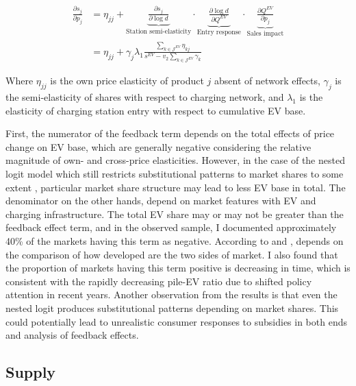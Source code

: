 \documentclass[12pt]{article}
\begin{document}
\begin{equation}
\begin{aligned}
\frac{\partial s_j}{\partial p_j} &= \eta_{jj} + 
\underbrace{\frac{\partial s_j}{\partial \log d}}_{\text{Station semi-elasticity}} 
\cdot \underbrace{\frac{\partial \log d}{\partial Q^{EV}}}_{\text{Entry response}} 
\cdot \underbrace{\frac{\partial Q^{EV}}{\partial p_j}}_{\text{Sales impact}} \\
&= \eta_{jj} + \gamma_j \lambda_1 \frac{\sum_{k \in \mathcal{J}^{EV}} \eta_{kj}}{s^{EV} - v_2 \sum_{k \in \mathcal{J}^{EV}} \gamma_k}
\end{aligned}
\end{equation}

Where $\eta_{jj}$ is the own price elasticity of product $j$ absent of network effects,
$\gamma_j$ is the semi-elasticity of shares with respect to charging network,
and $\lambda_1$ is the elasticity of charging station entry with respect to cumulative EV base.

First, the numerator of the feedback term depends on the total effects of price change on EV base, which are generally negative considering the relative magnitude of own- and cross-price elasticities.
However, in the case of the nested logit model which still restricts substitutional patterns to market shares to some extent \citep{nevo_practitioners_2000, grigolon_nested_2014}, particular market share structure may lead to less EV base in total.
The denominator on the other hands, depend on market features with EV and charging infrastructure.
The total EV share may or may not be greater than the feedback effect term, and in the observed sample, I documented approximately 40\% of the markets having this term as negative.
According to \citet{springel_network_2021} and \citet{remmy_adjustable_2024}, depends on the comparison of how developed are the two sides of market.
I also found that the proportion of markets having this term positive is decreasing in time, 
which is consistent with the rapidly decreasing pile-EV ratio due to shifted policy attention in recent years.
Another observation from the results is that even the nested logit produces substitutional patterns depending on market shares.
This could potentially lead to unrealistic consumer responses to subsidies in both ends and analysis of feedback effects.

    \subsection{Supply}
\end{document}
